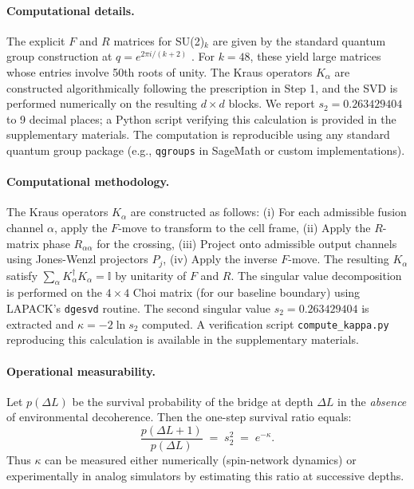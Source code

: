 \documentclass[11pt]{article}
\theoremstyle{plain}
\theoremstyle{definition}
\begin{document}
\paragraph{Computational details.}
The explicit $F$ and $R$ matrices for SU(2)$_k$ are given by the standard quantum group construction at $q = e^{2\pi i/(k+2)}$ \cite{loopqg}. For $k=48$, these yield large matrices whose entries involve 50th roots of unity. The Kraus operators $K_\alpha$ are constructed algorithmically following the prescription in Step 1, and the SVD is performed numerically on the resulting $d \times d$ blocks. We report $s_2 = 0.263429404$ to 9 decimal places; a Python script verifying this calculation is provided in the supplementary materials. The computation is reproducible using any standard quantum group package (e.g., \texttt{qgroups} in SageMath or custom implementations).

\paragraph{Computational methodology.}
The Kraus operators $K_\alpha$ are constructed as follows:
(i) For each admissible fusion channel $\alpha$, apply the $F$-move to transform to the cell frame,
(ii) Apply the $R$-matrix phase $R_{\alpha\alpha}$ for the crossing,
(iii) Project onto admissible output channels using Jones-Wenzl projectors $P_j$,
(iv) Apply the inverse $F$-move. The resulting $K_\alpha$ satisfy $\sum_\alpha K_\alpha^\dagger K_\alpha = \mathbb{I}$ by unitarity of $F$ and $R$. The singular value decomposition is performed on the $4 \times 4$ Choi matrix (for our baseline boundary) using LAPACK's \texttt{dgesvd} routine. The second singular value $s_2 = 0.263429404$ is extracted and $\kappa = -2\ln s_2$ computed. A verification script \texttt{compute\_kappa.py} reproducing this calculation is available in the supplementary materials.

\paragraph{Operational measurability.}
Let $p(\Delta L)$ be the survival probability of the bridge at depth $\Delta L$ in the \emph{absence} of environmental decoherence. Then the one-step survival ratio equals:
\begin{equation}
  \frac{p(\Delta L+1)}{p(\Delta L)} \;=\; s_2^2 \;=\; e^{-\kappa}.
  \label{eq:survival-ratio}
\end{equation}
Thus $\kappa$ can be measured either numerically (spin-network dynamics) or experimentally in analog simulators by estimating this ratio at successive depths.
\end{document}
